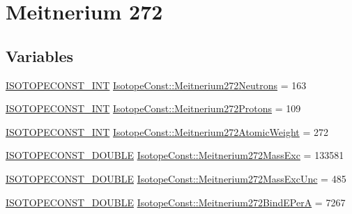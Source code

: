 \hypertarget{group___isotope_const-_meitnerium-_mt272}{}\section{Meitnerium 272}
\label{group___isotope_const-_meitnerium-_mt272}
\subsection*{Variables}
\begin{DoxyCompactItemize}
\item 
\mbox{\hyperlink{group___isotope_const-_macros_ga5f18360b3e99483a35c32d789e62621c}{I\+S\+O\+T\+O\+P\+E\+C\+O\+N\+S\+T\+\_\+\+I\+NT}} \mbox{\hyperlink{group___isotope_const-_meitnerium-_mt272_ga5a812c7ceff9ef53ac544067bac2d4d1}{Isotope\+Const\+::\+Meitnerium272\+Neutrons}} = 163
\item 
\mbox{\hyperlink{group___isotope_const-_macros_ga5f18360b3e99483a35c32d789e62621c}{I\+S\+O\+T\+O\+P\+E\+C\+O\+N\+S\+T\+\_\+\+I\+NT}} \mbox{\hyperlink{group___isotope_const-_meitnerium-_mt272_gad2cbd83b3d4c756306d0f9080595de34}{Isotope\+Const\+::\+Meitnerium272\+Protons}} = 109
\item 
\mbox{\hyperlink{group___isotope_const-_macros_ga5f18360b3e99483a35c32d789e62621c}{I\+S\+O\+T\+O\+P\+E\+C\+O\+N\+S\+T\+\_\+\+I\+NT}} \mbox{\hyperlink{group___isotope_const-_meitnerium-_mt272_ga409c5eaf3c7f1c089e795c917a6c7011}{Isotope\+Const\+::\+Meitnerium272\+Atomic\+Weight}} = 272
\item 
\mbox{\hyperlink{group___isotope_const-_macros_ga8f45a7272ce02c0b4c65c44636ed719a}{I\+S\+O\+T\+O\+P\+E\+C\+O\+N\+S\+T\+\_\+\+D\+O\+U\+B\+LE}} \mbox{\hyperlink{group___isotope_const-_meitnerium-_mt272_ga2e221b5ddfa41c47b3e193c8ceecf911}{Isotope\+Const\+::\+Meitnerium272\+Mass\+Exc}} = 133581
\item 
\mbox{\hyperlink{group___isotope_const-_macros_ga8f45a7272ce02c0b4c65c44636ed719a}{I\+S\+O\+T\+O\+P\+E\+C\+O\+N\+S\+T\+\_\+\+D\+O\+U\+B\+LE}} \mbox{\hyperlink{group___isotope_const-_meitnerium-_mt272_ga5fa841df56ca7fec72480efc6c14938b}{Isotope\+Const\+::\+Meitnerium272\+Mass\+Exc\+Unc}} = 485
\item 
\mbox{\hyperlink{group___isotope_const-_macros_ga8f45a7272ce02c0b4c65c44636ed719a}{I\+S\+O\+T\+O\+P\+E\+C\+O\+N\+S\+T\+\_\+\+D\+O\+U\+B\+LE}} \mbox{\hyperlink{group___isotope_const-_meitnerium-_mt272_gacea4e3ebe5ccefb753ba3792d767c9f9}{Isotope\+Const\+::\+Meitnerium272\+Bind\+E\+PerA}} = 7267
\item 

\end{DoxyCompactItemize}

